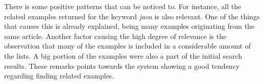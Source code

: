 There is some positive patterns that can be noticed to. For instance, all the related examples returned for the keyword \textit{java} is also relevant. One of the things that causes this is already explained, being many examples originating from the same article. Another factor causing the high degree of relevance is the observation that many of the examples is included in a considerable amount of the lists. A big portion of the examples were also a part of the initial search results. These remarks points towards the system showing a good tendency regarding finding related examples.


\cleardoublepage